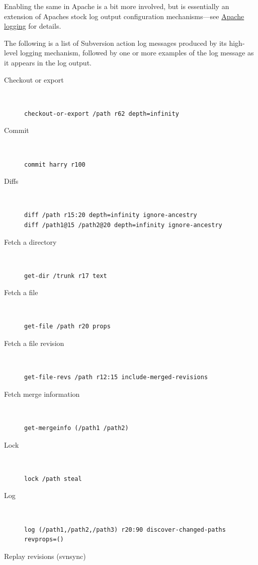 Enabling the same in Apache is a bit more involved, but is essentially
an extension of Apache\textquotesingle s stock log output configuration
mechanisms---see \hyperref[svn.serverconfig.httpd.extra.logging]{Apache
logging} for details.

The following is a list of Subversion action log messages produced by
its high-level logging mechanism, followed by one or more examples of
the log message as it appears in the log output.

\begin{description}
\item[Checkout or export] ~ 
\begin{verbatim}
checkout-or-export /path r62 depth=infinity
\end{verbatim}
\item[Commit] ~ 
\begin{verbatim}
commit harry r100
\end{verbatim}
\item[Diffs] ~ 
\begin{verbatim}
diff /path r15:20 depth=infinity ignore-ancestry
diff /path1@15 /path2@20 depth=infinity ignore-ancestry
\end{verbatim}
\item[Fetch a directory] ~ 
\begin{verbatim}
get-dir /trunk r17 text
\end{verbatim}
\item[Fetch a file] ~ 
\begin{verbatim}
get-file /path r20 props
\end{verbatim}
\item[Fetch a file revision] ~ 
\begin{verbatim}
get-file-revs /path r12:15 include-merged-revisions
\end{verbatim}
\item[Fetch merge information] ~ 
\begin{verbatim}
get-mergeinfo (/path1 /path2)
\end{verbatim}
\item[Lock] ~ 
\begin{verbatim}
lock /path steal
\end{verbatim}
\item[Log] ~ 
\begin{verbatim}
log (/path1,/path2,/path3) r20:90 discover-changed-paths revprops=()
\end{verbatim}
\item[Replay revisions (svnsync)] ~ 

\end{description}
